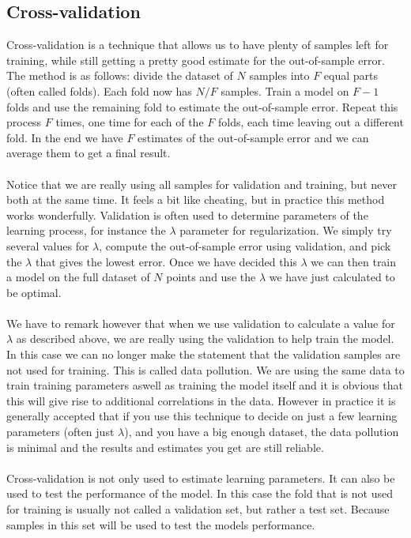 \subsection{Cross-validation}
Cross-validation\cite{caltechmachinelearning}\cite{kohavi1995study} is a technique that allows us to have plenty of samples left for training, while still getting a pretty good estimate for the out-of-sample error. The method is as follows: divide the dataset of $N$ samples into $F$ equal parts (often called folds). Each fold now has $N/F$ samples. Train a model on $F-1$ folds and use the remaining fold to estimate the out-of-sample error. Repeat this process $F$ times, one time for each of the $F$ folds, each time leaving out a different fold. In the end we have $F$ estimates of the out-of-sample error and we can average them to get a final result.\\ \\
Notice that we are really using all samples for validation and training, but never both at the same time. It feels a bit like cheating, but in practice this method works wonderfully. Validation is often used to determine parameters of the learning process, for instance the $\lambda$ parameter for regularization. We simply try several values for $\lambda$, compute the out-of-sample error using validation, and pick the $\lambda$ that gives the lowest error. Once we have decided this $\lambda$ we can then train a model on the full dataset of $N$ points and use the $\lambda$ we have just calculated to be optimal. \\ \\
We have to remark however that when we use validation to calculate a value for $\lambda$ as described above, we are really using the validation to help train the model. In this case we can no longer make the statement that the validation samples are not used for training. This is called data pollution. We are using the same data to train training parameters aswell as training the model itself and it is obvious that this will give rise to additional correlations in the data. However in practice it is generally accepted that if you use this technique to decide on just a few learning parameters (often just $\lambda$), and you have a big enough dataset, the data pollution is minimal and the results and estimates you get are still reliable\cite{caltechmachinelearning}. \\ \\

Cross-validation is not only used to estimate learning parameters. It can also be used to test the performance of the model. In this case the fold that is not used for training is usually not called a validation set, but rather a test set. Because samples in this set will be used to test the models performance. 

